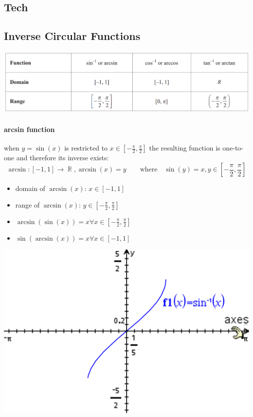 \documentclass[a4paper,twoside,10pt]{article}
\DeclareMathOperator\R{\mathbb{R}}
\begin{document}
		\subsection{Tech}
		
		\subsection{Inverse Circular Functions}
			\includegraphics[width=\linewidth]{oldformulasheetinvtrig.png}
			\paragraph{arcsin function} when $y=\sin(x)$ is restricted to $x\in\left[-\frac{\pi}{2},\frac{\pi}{2}\right]$ the resulting function is one-to-one and therefore its inverse exists:
			\[
				\arcsin: [-1,1]\to\R,\arcsin(x)=y\qquad\text{where}\quad\sin(y)=x,y\in\left[-\frac{\pi}{2},\frac{\pi}{2}\right]
			\]
			\begin{minipage}{0.5\textwidth}
				\begin{itemize}
					\item domain of $\arcsin(x)$: $x\in[-1,1]$
					\item range of $\arcsin(x)$: $y\in\left[-\frac{\pi}{2},\frac{\pi}{2}\right]$
					\item $\arcsin(\sin(x))=x\forall x\in\left[-\frac{\pi}{2},\frac{\pi}{2}\right]$
					\item $\sin(\arcsin(x))=x\forall x\in[-1,1]$
				\end{itemize}
			\end{minipage}
			\hfill
			\begin{minipage}{0.4\textwidth}
				\includegraphics[width=\linewidth]{arcsin.png}
			\end{minipage}
		
\end{document}

